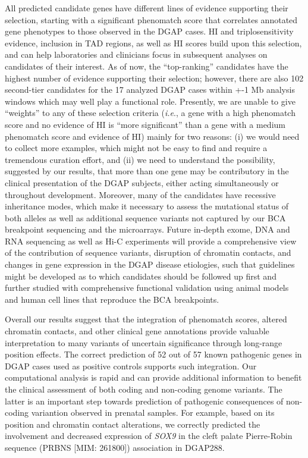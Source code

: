 \documentclass[a4paper,twoside=true,openright,parskip=full,chapterprefix=true,11pt,headings=normal,bibliography=totoc,listof=totoc,titlepage=on,captions=tableabove,draft=false]{scrreprt}
\theoremstyle{definition}
\theoremstyle{definition}
\theoremstyle{definition}
\theoremstyle{remark}
\begin{document}
All predicted candidate genes have different lines of evidence
supporting their selection, starting with a significant phenomatch score
that correlates annotated gene phenotypes to those observed in the DGAP
cases. HI and triplosensitivity evidence, inclusion in TAD regions, as
well as HI scores build upon this selection, and can help laboratories
and clinicians focus in subsequent analyses on candidates of their
interest. As of now, the ``top-ranking'' candidates have the highest
number of evidence supporting their selection; however, there are also
102 second-tier candidates for the 17 analyzed DGAP cases within +-1 Mb
analysis windows which may well play a functional role. Presently, we
are unable to give ``weights'' to any of these selection criteria
(\emph{i.e}., a gene with a high phenomatch score and no evidence of HI
is ``more significant'' than a gene with a medium phenomatch score and
evidence of HI) mainly for two reasons: (i) we would need to collect
more examples, which might not be easy to find and require a tremendous
curation effort, and (ii) we need to understand the possibility,
suggested by our results, that more than one gene may be contributory in
the clinical presentation of the DGAP subjects, either acting
simultaneously or throughout development. Moreover, many of the
candidates have recessive inheritance modes, which make it necessary to
assess the mutational status of both alleles as well as additional
sequence variants not captured by our BCA breakpoint sequencing and the
microarrays. Future in-depth exome, DNA and RNA sequencing as well as
Hi-C experiments will provide a comprehensive view of the contribution
of sequence variants, disruption of chromatin contacts, and changes in
gene expression in the DGAP disease etiologies, such that guidelines
might be developed as to which candidates should be followed up first
and further studied with comprehensive functional validation using
animal models and human cell lines that reproduce the BCA breakpoints.

Overall our results suggest that the integration of phenomatch scores,
altered chromatin contacts, and other clinical gene annotations provide
valuable interpretation to many variants of uncertain significance
through long-range position effects. The correct prediction of 52 out of
57 known pathogenic genes in DGAP cases used as positive controls
supports such integration. Our computational analysis is rapid and can
provide additional information to benefit the clinical assessment of
both coding and non-coding genome variants. The latter is an important
step towards prediction of pathogenic consequences of non-coding
variantion observed in prenatal samples. For example, based on its
position and chromatin contact alterations, we correctly predicted the
involvement and decreased expression of \emph{SOX9} in the cleft palate
Pierre-Robin sequence (PRBNS {[}MIM: 261800{]}) association in
DGAP288.\citep{Ordulu2016}
\end{document}
